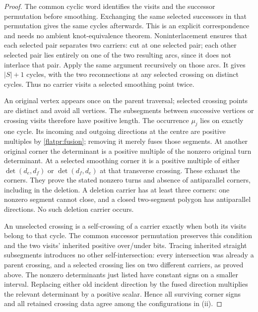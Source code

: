 \begin{proof}\leanok{}
The common cyclic word identifies the visits and the successor
permutation before smoothing. Exchanging the same selected successors
in that permutation gives the same cycles afterwards. This is an
explicit correspondence and needs no ambient knot-equivalence theorem.
Noninterlacement ensures that each selected pair separates two carriers:
cut at one selected pair; each other selected pair lies entirely on one
of the two resulting arcs, since it does not interlace that pair.
Apply the same argument recursively on those arcs. It gives $|S|+1$
cycles, with the two reconnections at any selected crossing on distinct
cycles. Thus no carrier visits a selected smoothing point twice.

An original vertex appears once on the parent traversal; selected
crossing points are distinct and avoid all vertices. The subsegments
between successive vertices or crossing visits therefore have positive
length. The occurrence $\mu_j$ lies on exactly one cycle. Its incoming
and outgoing directions at the centre are positive multiples by
\eqref{flatpr:fusion}; removing it merely fuses those segments.
At another original corner the determinant is a positive multiple of
the nonzero original turn determinant. At a selected smoothing corner
it is a positive multiple of either $\det(d_e,d_f)$ or
$\det(d_f,d_e)$ at that transverse crossing. These exhaust the corners.
They prove the stated nonzero turns and absence of antiparallel corners,
including in the deletion. A deletion carrier has at least three
corners: one nonzero segment cannot close, and a closed two-segment
polygon has antiparallel directions. No such deletion carrier occurs.

An unselected crossing is a self-crossing of a carrier exactly when
both its visits belong to that cycle. The common successor permutation
preserves this condition and the two visits' inherited positive
over/under bits. Tracing inherited straight subsegments introduces no
other self-intersection: every intersection was already a parent
crossing, and a selected crossing lies on two different carriers, as
proved above. The nonzero determinants just listed have constant
signs on a smaller interval. Replacing either old incident direction
by the fused direction multiplies the relevant determinant by a
positive scalar. Hence all surviving corner signs and all retained
crossing data agree among the configurations in (ii).


\end{proof}

